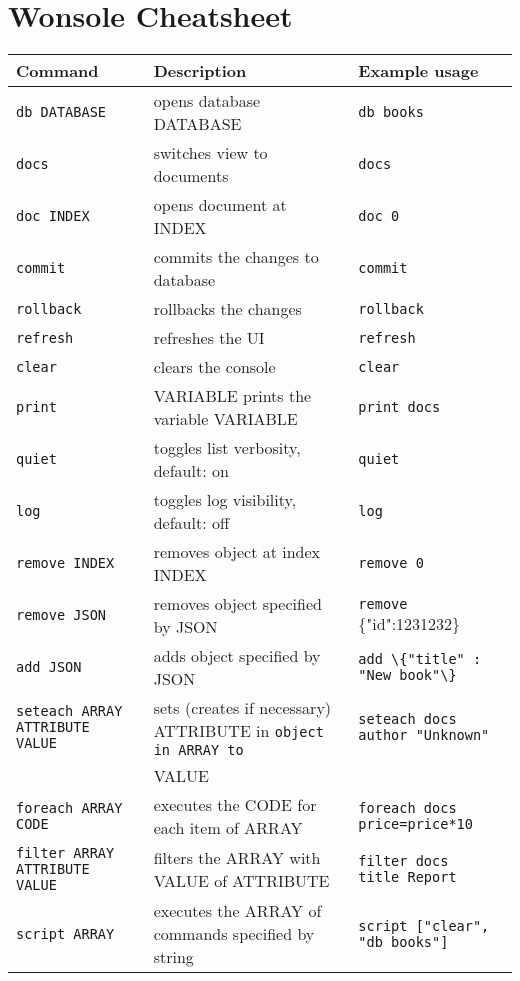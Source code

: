 \thispagestyle{empty}
\section*{Wonsole Cheatsheet}
\begin{tabularx}{\textwidth}{ | l | X | l | }
\hline
\textbf{Command} & \textbf{Description} & \textbf{Example usage} \\ \hline 
\verb|db DATABASE| &
opens database DATABASE &
\verb|db books| \\ \hline

\verb|docs| &
switches view to documents &
\verb|docs| \\ \hline

\verb|doc INDEX| &
opens document at INDEX &
\verb|doc 0| \\ \hline

\verb|commit| &
commits the changes to database &
\verb|commit| \\ \hline

\verb|rollback| &
rollbacks the changes &
\verb|rollback| \\ \hline

\verb|refresh| &
refreshes the UI &
\verb|refresh| \\ \hline

\verb|clear| &
clears the console &
\verb|clear| \\ \hline

\verb|print| &
VARIABLE	prints the variable VARIABLE &
\verb|print docs| \\ \hline

\verb|quiet| &
toggles list verbosity, default: on &
\verb|quiet| \\ \hline

\verb|log| &
toggles log visibility, default: off &
\verb|log| \\ \hline

\verb|remove INDEX|&
removes object at index INDEX &
\verb|remove 0| \\ \hline

\verb|remove JSON| &
removes object specified by JSON &
\verb|remove| \{"id":1231232\} \\ \hline

\verb|add JSON| &
 adds object specified by JSON &
\verb|add \{"title" : "New book"\}| \\ \hline
 
\verb|seteach ARRAY ATTRIBUTE VALUE| &
sets (creates if necessary) ATTRIBUTE in \verb|object in ARRAY to | &
\verb|seteach docs author "Unknown"| \\ & VALUE & \\ \hline

\verb|foreach ARRAY CODE| &
executes the CODE for each item of ARRAY &
\verb|foreach docs price=price*10| \\ \hline

\verb|filter ARRAY ATTRIBUTE VALUE| &
filters the ARRAY with VALUE of ATTRIBUTE &
\verb|filter docs  title Report| \\ \hline

\verb|script ARRAY| &
executes the ARRAY of commands specified by string &
\verb|script ["clear", "db books"]| \\ \hline
\end{tabularx}

